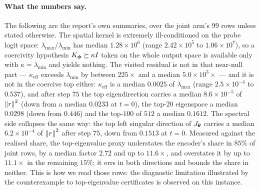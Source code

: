 \paragraph{What the numbers say.} The following are the report's own
summaries, over the joint arm's $99$ rows unless stated otherwise. The spatial
kernel is extremely ill-conditioned on the probe logit space:
$\lambda_{\max}/\lambda_{\min}$ has median $1.28 \times 10^{6}$ (range
$2.42\times10^{5}$ to $1.06\times10^{7}$), so a coercivity hypothesis
$K_{\boldsymbol{\phi}} \succeq \kappa I$ taken on the whole output space is available only
with $\kappa = \lambda_{\min}$ and yields nothing. The visited residual is not
in that near-null part --- $\kappa_{\mathrm{eff}}$ exceeds $\lambda_{\min}$ by
between $225\times$ and a median $5.0 \times 10^{3}\times$ --- and it is not in
the coercive top either: $\kappa_{\mathrm{eff}}$ is a median $0.0025$ of
$\lambda_{\max}$ (range $2.5\times10^{-4}$ to $0.537$), and after step $75$ the
top eigendirection carries a median $8.6\times10^{-5}$ of $\left\lVert r\right\rVert^2$ (down
from a median $0.0233$ at $t=0$), the top-$20$ eigenspace a median $0.0298$
(down from $0.446$) and the top-$100$ of $512$ a median $0.1612$. The spectral
side collapses the same way: the top left singular direction of $J_{\boldsymbol{\theta}}$
carries a median $6.2\times10^{-4}$ of $\left\lVert r\right\rVert^2$ after step $75$, down from
$0.1513$ at $t=0$. Measured against the realised share, the top-eigenvalue
proxy understates the encoder's share in $85\%$ of joint rows, by a median
factor $2.72$ and up to $11.6\times$, and overstates it by up to $11.1\times$
in the remaining $15\%$; it errs in both directions and bounds the share in
neither. This is how we read those rows: the diagnostic limitation illustrated
by the counterexample to top-eigenvalue certificates is observed on this
instance.


